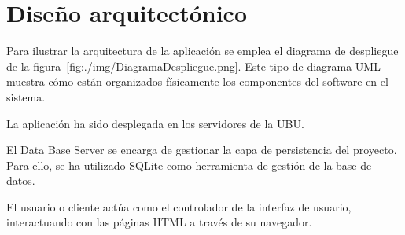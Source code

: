 \section{Diseño arquitectónico}


Para ilustrar la arquitectura de la aplicación se emplea el diagrama de despliegue de la figura~\ref{fig:./img/DiagramaDespliegue.png}. Este tipo de diagrama UML muestra cómo están organizados físicamente los componentes del software en el sistema.

La aplicación ha sido desplegada en los servidores de la UBU.

El Data Base Server se encarga de gestionar la capa de persistencia del proyecto. Para ello, se ha utilizado SQLite como herramienta de gestión de la base de datos.

El usuario o cliente actúa como el controlador de la interfaz de usuario, interactuando con las páginas HTML a través de su navegador.
